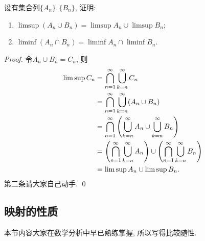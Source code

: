 \begin{exercise}
    设有集合列$\{A_n\}, \{B_n\}$, 证明:
    \begin{enumerate}
    \item $\limsup (A_n \cup B_n) = \limsup A_n \cup \limsup B_n$;
    \item $\liminf (A_n \cap B_n) = \liminf A_n \cap \liminf B_n$.
    \end{enumerate}
\end{exercise}
\begin{proof}
    令$A_n \cup B_n = C_n$, 则
    \begin{align*}
    \limsup C_n
    &= \bigcap_{n=1}^{\infty}\bigcup_{k=n}^{\infty} C_n \\
    &= \bigcap_{n=1}^{\infty}\bigcup_{k=n}^{\infty} (A_n \cup B_n) \\
    &=\bigcap_{n=1}^{\infty} \left(\bigcup_{k=n}^{\infty} A_n \cup \bigcup_{k=n}^{\infty} B_n\right) \\
    &= \left(\bigcap_{n=1}^{\infty}\bigcup_{k=n}^{\infty} A_n\right) \cup 
       \left(\bigcap_{n=1}^{\infty}\bigcup_{k=n}^{\infty} B_n\right) \\
    &= \limsup A_n \cup \limsup B_n.
    \end{align*}
    第二条请大家自己动手. \qed 
\end{proof}

\subsection{映射的性质}
本节内容大家在数学分析中早已熟练掌握, 所以写得比较随性.
